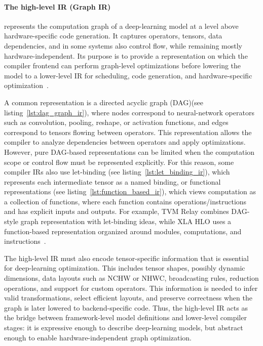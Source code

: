 \documentclass[12pt,a4paper]{report}
\begin{document}
\paragraph{The high-level IR (Graph IR)} represents the computation graph of a deep-learning model
at a level above hardware-specific code generation. It captures operators, tensors, data dependencies,
and in some systems also control flow, while remaining mostly hardware-independent. Its purpose is
to provide a representation on which the compiler frontend can perform graph-level optimizations
before lowering the model to a lower-level IR for scheduling, code generation, and hardware-specific
optimization~\cite{li2020deep}.

A common representation is a directed acyclic graph (DAG)(see listing~\ref{lst:dag_graph_ir}), where nodes correspond
to neural-network
operators such as convolution, pooling, reshape, or activation functions, and edges correspond to tensors
flowing between operators. This representation allows the compiler to analyze dependencies between
operators and apply optimizations. However, pure DAG-based representations
can be limited when the computation scope or control flow must be represented explicitly. For this reason,
some compiler IRs also use let-binding (see listing~\ref{lst:let_binding_ir}), which represents each intermediate
tensor as a named binding,
or functional representations (see listing~\ref{lst:function_based_ir}), which views computation
as a collection of functions, where each function contains
operations/instructions and has explicit inputs and outputs. For example, TVM Relay combines
DAG-style graph representation with let-binding ideas, while XLA HLO uses a function-based representation
organized around modules, computations, and instructions~\cite{li2020deep}.

The high-level IR must also encode tensor-specific information that is essential for deep-learning
optimization. This includes tensor shapes, possibly dynamic dimensions, data layouts such as NCHW or
NHWC, broadcasting rules, reduction operations, and support for custom operators. This information is
needed to infer valid transformations, select efficient layouts, and preserve correctness when the graph is
later lowered to backend-specific code. Thus, the high-level IR acts as the bridge between framework-level
model definitions and lower-level compiler stages: it is expressive enough to describe deep-learning
models, but abstract enough to enable hardware-independent graph optimization.
\end{document}
